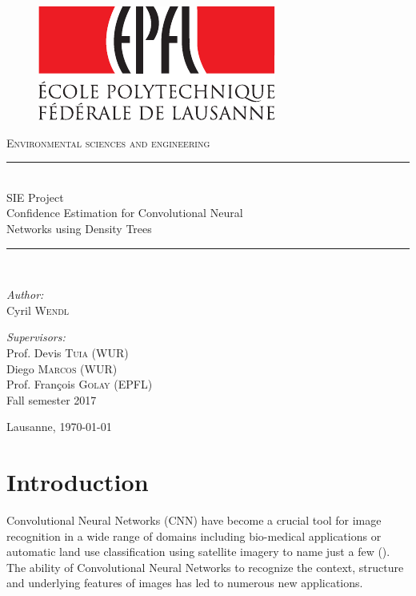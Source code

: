 \documentclass{article}
\begin{document}
\begin{titlepage}
	\begin{center}
		\begin{figure}[h]
			\centering
			\includegraphics[width=.25\textwidth]{logo} 
		\end{figure}
		\textsc{Environmental sciences and engineering}\\[0.5cm]
		
		\newcommand{\HRule}{\rule{\linewidth}{0.2mm}}
		\HRule \\[0.5cm]
		{\large SIE Project}\\[0.2cm]
		{\huge Confidence Estimation for Convolutional Neural\\[.2cm] Networks using Density Trees
		}\\[0.5cm]
		\HRule \\[0.5cm]
		
		\begin{minipage}[t]{0.45\textwidth}
			\begin{flushleft} \large
				\emph{Author:}\\[0.2cm]
				Cyril \textsc{Wendl}
			\end{flushleft}
		\end{minipage}
		\hfill
		\begin{minipage}[t]{0.45\textwidth}
			\begin{flushright} \large
				\emph{Supervisors:}\\[0.2cm]
				Prof. Devis \textsc{Tuia} (WUR)\\
				Diego \textsc{Marcos} (WUR)\\
				Prof. François \textsc{Golay} (EPFL)\\
				Fall semester 2017
			\end{flushright}
		\end{minipage}
		\vfill
		
		{\large Lausanne, \today}
	\end{center}
\end{titlepage}

\section{Introduction}
Convolutional Neural Networks (CNN) have become a crucial tool for image recognition in a wide range of domains including bio-medical applications or automatic land use classification using satellite imagery to name just a few (\cite{Volpi2017DenseSL,kampffmeyer, ucf}). The ability of Convolutional Neural Networks to recognize the context, structure and underlying features of images has led to numerous new applications.\\
\end{document}

